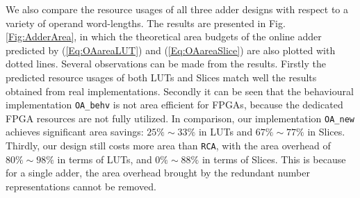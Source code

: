 \documentclass[conference]{IEEEtran}
\begin{document}
We also compare the resource usages of all three adder designs with respect to a variety of operand word-lengths. The results are presented in Fig.\ref{Fig:AdderArea}, in which the theoretical area budgets of the online adder predicted by (\ref{Eq:OAareaLUT}) and (\ref{Eq:OAareaSlice}) are also plotted with dotted lines. Several observations can be made from the results. Firstly the predicted resource usages of both LUTs and Slices match well the results obtained from real implementations. Secondly it can be seen that the behavioural implementation \texttt{OA\_behv} is not area efficient for FPGAs, because the dedicated FPGA resources are not fully utilized. In comparison, our implementation \texttt{OA\_new} achieves significant area savings: $25\%\sim 33\%$ in LUTs and $67\%\sim77\%$ in Slices. Thirdly, our design still costs more area than \texttt{RCA}, with the area overhead of $80\%\sim98\%$ in terms of LUTs, and $0\%\sim88\%$ in terms of Slices. This is because for a single adder, the area overhead brought by the redundant number representations cannot be removed. 
\end{document}
